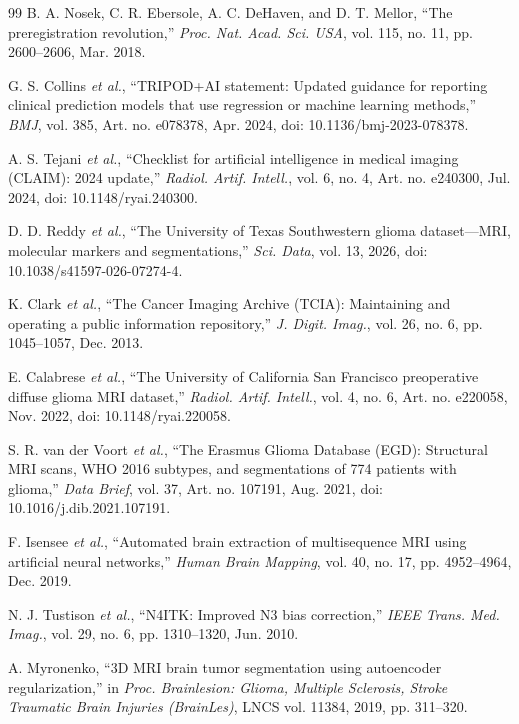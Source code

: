 \documentclass[journal]{IEEEtran}
\begin{document}
\begin{thebibliography}{99}
 B. A. Nosek, C. R. Ebersole, A. C. DeHaven, and D. T. Mellor, ``The preregistration revolution,'' \emph{Proc. Nat. Acad. Sci. USA}, vol. 115, no. 11, pp. 2600--2606, Mar. 2018.

 G. S. Collins \emph{et al.}, ``TRIPOD+AI statement: Updated guidance for reporting clinical prediction models that use regression or machine learning methods,'' \emph{BMJ}, vol. 385, Art. no. e078378, Apr. 2024, doi: 10.1136/bmj-2023-078378.

 A. S. Tejani \emph{et al.}, ``Checklist for artificial intelligence in medical imaging (CLAIM): 2024 update,'' \emph{Radiol. Artif. Intell.}, vol. 6, no. 4, Art. no. e240300, Jul. 2024, doi: 10.1148/ryai.240300.

 D. D. Reddy \emph{et al.}, ``The University of Texas Southwestern glioma dataset---MRI, molecular markers and segmentations,'' \emph{Sci. Data}, vol. 13, 2026, doi: 10.1038/s41597-026-07274-4.

 K. Clark \emph{et al.}, ``The Cancer Imaging Archive (TCIA): Maintaining and operating a public information repository,'' \emph{J. Digit. Imag.}, vol. 26, no. 6, pp. 1045--1057, Dec. 2013.

 E. Calabrese \emph{et al.}, ``The University of California San Francisco preoperative diffuse glioma MRI dataset,'' \emph{Radiol. Artif. Intell.}, vol. 4, no. 6, Art. no. e220058, Nov. 2022, doi: 10.1148/ryai.220058.

 S. R. van der Voort \emph{et al.}, ``The Erasmus Glioma Database (EGD): Structural MRI scans, WHO 2016 subtypes, and segmentations of 774 patients with glioma,'' \emph{Data Brief}, vol. 37, Art. no. 107191, Aug. 2021, doi: 10.1016/j.dib.2021.107191.

 F. Isensee \emph{et al.}, ``Automated brain extraction of multisequence MRI using artificial neural networks,'' \emph{Human Brain Mapping}, vol. 40, no. 17, pp. 4952--4964, Dec. 2019.

 N. J. Tustison \emph{et al.}, ``N4ITK: Improved N3 bias correction,'' \emph{IEEE Trans. Med. Imag.}, vol. 29, no. 6, pp. 1310--1320, Jun. 2010.

 A. Myronenko, ``3D MRI brain tumor segmentation using autoencoder regularization,'' in \emph{Proc. Brainlesion: Glioma, Multiple Sclerosis, Stroke Traumatic Brain Injuries (BrainLes)}, LNCS vol. 11384, 2019, pp. 311--320.


\end{thebibliography}
\end{document}
